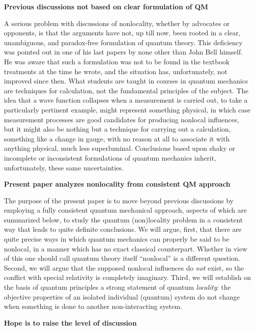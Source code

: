 \documentclass[10pt]{article} %
\def\outl#1{\par{\medskip\noindent\hspace*{.5cm}\bf
      \mathversion{bold}#1\mathversion{normal}\smallskip} }
\def\np{} \def\xa{} \def\xb{} \def\xn{} \def\xp{}
\def\outl#1{} \def\np{} \def\xa{} \def\xb{} \def\xn{} \def\xp{}
\def\outl#1{\par{\medskip\noindent\hspace*{.5cm}\bf
      \mathversion{bold}#1\mathversion{normal}\smallskip} }
\def\np{\newpage }\def\xn{\nopagebreak }\def\xp{\pagebreak }
\begin{document}
\xb
\outl{Previous discussions not based on clear formulation of QM}
\xa




A serious problem with discussions of nonlocality, whether by advocates or
opponents, is that the arguments have not, up till now, been rooted in a
clear, unambiguous, and paradox-free formulation of quantum theory.  This
deficiency was pointed out in one of his last papers \cite{Bll90} by none
other than John Bell himself.  He was aware that such a formulation was not to
be found in the textbook treatments at the time he wrote, and the situation
has, unfortunately, not improved since then.  What students are taught in
courses in quantum mechanics are techniques for calculation, not the
fundamental principles of the subject.  The idea that a wave function
collapses when a measurement is carried out, to take a particularly pertinent
example, might represent something physical, in which case measurement
processes are good candidates for producing nonlocal influences, but it might
also be nothing but a technique for carrying out a calculation, something like
a change in gauge, with no reason at all to associate it with anything
physical, much less superluminal.  Conclusions based upon shaky or incomplete
or inconsistent formulations of quantum mechanics inherit, unfortunately,
these same uncertainties.

\xb
\outl{Present paper analyzes nonlocality from consistent QM approach}
\xa



The purpose of the present paper is to move beyond previous discussions by
employing a fully consistent quantum mechanical approach, aspects of which are
summarized below, to study the quantum (non)locality problem in a consistent
way that leads to quite definite conclusions.  We will argue, first, that
there are quite precise ways in which quantum mechanics can properly be said
to be nonlocal, in a manner which has no exact classical counterpart. Whether
in view of this one should call quantum theory itself ``nonlocal'' is a
different question. Second, we will argue that the supposed nonlocal
influences do \emph{not} exist, so the conflict with special relativity is
completely imaginary.  Third, we will establish on the basis of quantum
principles a strong statement of quantum \emph{locality}: the objective
properties of an isolated individual (quantum) system do not change when
something is done to another non-interacting system.

\xb
\outl{Hope is to raise the level of discussion}
\xa
\end{document}
